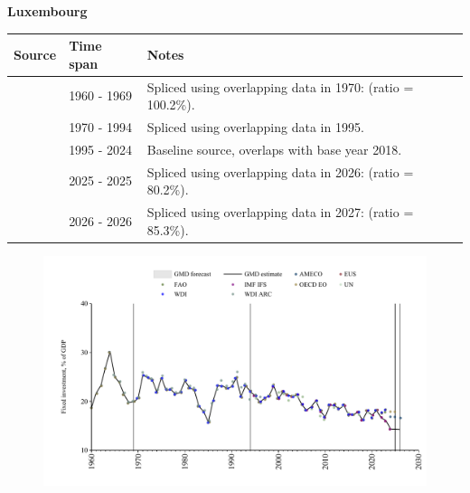 \documentclass[12pt,a4paper,landscape]{article}
\begin{document}
\begin{adjustbox}{max totalsize={\paperwidth}{\paperheight},center}
\begin{minipage}[t][\textheight][t]{\textwidth}
\vspace*{0.5cm}
{}
\begin{center}
{\Large\bfseries Luxembourg}
\end{center}
\vspace{0.5cm}
\begin{table}[H]
\centering
\small
\begin{tabular}{|l|l|l|}
\hline
\textbf{Source} & \textbf{Time span} & \textbf{Notes} \\
\hline
\rowcolor{white}\cite{OECD_EO}& 1960 - 1969 &Spliced using overlapping data in 1970: (ratio = 100.2\%).\\
\rowcolor{lightgray}\cite{WDI}& 1970 - 1994 &Spliced using overlapping data in 1995.\\
\rowcolor{white}\cite{EUS}& 1995 - 2024 &Baseline source, overlaps with base year 2018.\\
\rowcolor{lightgray}\cite{OECD_EO}& 2025 - 2025 &Spliced using overlapping data in 2026: (ratio = 80.2\%).\\
\rowcolor{white}\cite{AMECO}& 2026 - 2026 &Spliced using overlapping data in 2027: (ratio = 85.3\%).\\
\hline
\end{tabular}
\end{table}
\begin{figure}[H]
\centering
\includegraphics[width=\textwidth,height=0.6\textheight,keepaspectratio]{graphs/LUX_finv_GDP.pdf}
\end{figure}
\end{minipage}
\end{adjustbox}
\end{document}
